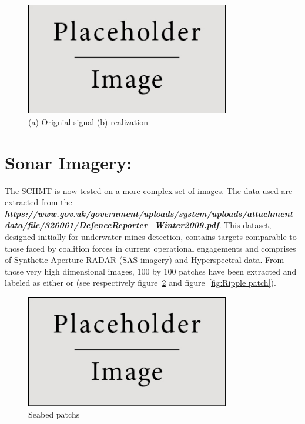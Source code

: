\documentclass[a4paper,11pt]{report}
\begin{document}
{		\begin{figure}
			\begin{center}
				\includegraphics[width=3.5in]{placeholder.jpg}
			  \caption[Shape classification: triangle]{(a) Orignial signal (b) realization}
			  \label{fig:Shape triangle}
			\end{center}
		\end{figure}
		
  \section{Sonar Imagery:}
		\label{sec:Exp/Sonar:}
		The SCHMT is now tested on a more complex set of images. The data used are extracted from the  \textbf{\textit{\url{https://www.gov.uk/government/uploads/system/uploads/attachment_data/file/326061/DefenceReporter_Winter2009.pdf}}}. This dataset, designed initially for underwater mines detection, contains targets comparable to those faced by coalition forces in current operational engagements and comprises of Synthetic Aperture RADAR (SAS imagery) and Hyperspectral data. From those very high dimensional images, $100$ by $100$ patches have been extracted and labeled as either  or  (see respectively figure~\ref{fig:Seabed patch} and figure~\ref{fig:Ripple patch}).\\

		\begin{figure}
			\begin{center}
				\includegraphics[width=3.5in]{placeholder.jpg}
				\caption{Seabed patchs}
				\label{fig:Seabed patch}
			\end{center}
		\end{figure}
			
}
\end{document}
